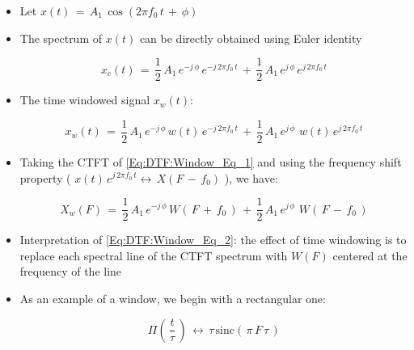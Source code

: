 \begin{itemize}

\item Let $x(t) \, = \, A_1 \, \cos( 2 \pi f_0 \, t \, + \, \phi)$

\item The spectrum of $x(t)$ can be directly obtained using Euler identity

\begin{equation}
    x_c(t) \, = \, \displaystyle\frac{1}{2} \, A_1 \, e^{-j \, \phi} \, e^{-j \,2 \pi f_0 \, t} \, + \, \displaystyle\frac{1}{2} \, A_1 \, e^{j \, \phi} \, e^{j \, 2 \pi f_0 \, t}
\end{equation}


\item The time windowed signal $x_w(t)$:

\begin{equation}
 x_w(t) \, = \, \displaystyle\frac{1}{2} \, A_1 \, e^{-j \, \phi} \, w(t) \, e^{-j \, 2 \pi f_0 \, t} \, + \, \displaystyle\frac{1}{2} \, A_1 \, e^{j \, \phi} \, \, w(t) \, e^{j \, 2 \pi f_0 \, t} 
 \label{Eq:DTF:Window_Eq_1}
\end{equation}

\item Taking the CTFT of \autoref{Eq:DTF:Window_Eq_1} and using the frequency shift property \cite{signal_processing_Lathi} ( $x(t) \, e^{j \, 2 \pi f_0 \, t} \leftrightarrow \, X(F \, - \, f_0)$ ), we have:

\begin{equation}
   X_w(F) \, = \, \displaystyle\frac{1}{2} \, A_1 \, e^{-j \, \phi} \, W(\, F \, + \, f_0 \,)  \, + \, \displaystyle\frac{1}{2} \, A_1 \, e^{j \, \phi} \, \, W(\, F \, - \, f_0 \,)
 \label{Eq:DTF:Window_Eq_2}  
\end{equation}

\item Interpretation of \autoref{Eq:DTF:Window_Eq_2}: the effect of time windowing is to replace each spectral line of the CTFT spectrum with   $W(F)$ centered at the frequency  of the line

\item As an example of a window, we begin with a rectangular one: 

\begin{equation}
\Pi \left(\, \displaystyle\frac{t}{\tau} \,\right) \, \leftrightarrow \, \tau \,  \text{sinc} \left(\, \pi \,F \,  \tau \,  \right)    
\end{equation}



\end{itemize}
